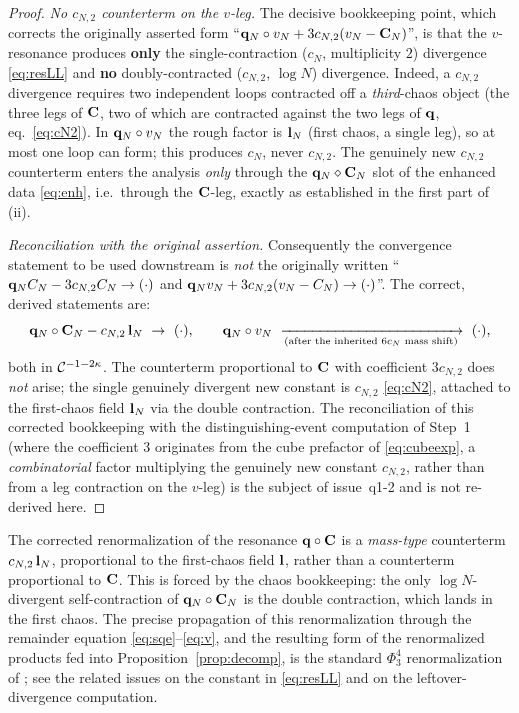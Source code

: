 \begin{proof}
\emph{No $c_{N,2}$ counterterm on the $v$-leg.} The decisive bookkeeping point, which
corrects the originally asserted form ``$\mathbf{q}_N\circ v_N+3c_{N,2}(v_N-\mathbf{C}_N)$'',
is that the $v$-resonance produces \textbf{only} the single-contraction ($c_N$,
multiplicity $2$) divergence \eqref{eq:resLL} and \textbf{no} doubly-contracted
($c_{N,2}$, $\log N$) divergence. Indeed, a $c_{N,2}$ divergence requires two
independent loops contracted off a \emph{third}-chaos object (the three legs of
$\mathbf{C}$, two of which are contracted against the two legs of $\mathbf{q}$, eq.~\eqref{eq:cN2}).
In $\mathbf{q}_N\circ v_N$ the rough factor is $\mathbf{l}_N$ (first chaos, a single leg), so at
most one loop can form; this produces $c_N$, never $c_{N,2}$. The genuinely new
$c_{N,2}$ counterterm enters the analysis \emph{only} through the
$\mathbf{q}_N\diamond\mathbf{C}_N$ slot of the enhanced data \eqref{eq:enh}, i.e.\ through the
$\mathbf{C}$-leg, exactly as established in the first part of (ii).

\emph{Reconciliation with the original assertion.} Consequently the convergence
statement to be used downstream is \emph{not} the originally written
``$\mathbf{q}_N C_N-3c_{N,2}C_N\to(\cdot)$ and $\mathbf{q}_N v_N+3c_{N,2}(v_N-C_N)\to(\cdot)$''.
The correct, derived statements are:
\[
\qoneLsq_N\circ\qoneIqc_N-c_{N,2}\,\qoneLin_N\ \to\ (\cdot),\qquad
\qoneLsq_N\circ v_N\ \xrightarrow[\text{(after the inherited $6c_N$ mass shift)}]{}\ (\cdot),
\]
both in $\mathcal{C}^{-1-2\kappa}$. The counterterm proportional to $\mathbf{C}$ with coefficient
$3c_{N,2}$ does \emph{not} arise; the single genuinely divergent new constant is
$c_{N,2}$ \eqref{eq:cN2}, attached to the first-chaos field $\mathbf{l}_N$ via the double
contraction. The reconciliation of this corrected bookkeeping with the
distinguishing-event computation of Step~1 (where the coefficient $3$ originates from
the cube prefactor of \eqref{eq:cubeexp}, a \emph{combinatorial} factor multiplying the
genuinely new constant $c_{N,2}$, rather than from a leg contraction on the $v$-leg) is
the subject of issue~q1-2 and is not re-derived here.

\end{proof}

\begin{remark}
The corrected renormalization of the resonance $\mathbf{q}\circ\mathbf{C}$ is a
\emph{mass-type} counterterm $c_{N,2}\,\mathbf{l}_N$, proportional to the first-chaos
field $\mathbf{l}$, rather than a counterterm proportional to $\mathbf{C}$. This is forced by
the chaos bookkeeping: the only $\log N$-divergent self-contraction of
$\mathbf{q}_N\circ\mathbf{C}_N$ is the double contraction, which lands in the first chaos. The
precise propagation of this renormalization through the remainder equation
\eqref{eq:sqe}--\eqref{eq:v}, and the resulting form of the renormalized products fed
into Proposition~\ref{prop:decomp}, is the standard $\Phi^4_3$ renormalization of
\cite{CC18,MW17b,EW24}; see the related issues on the constant in
\eqref{eq:resLL} and on the leftover-divergence computation.
\end{remark}

